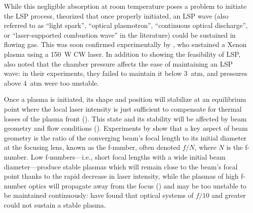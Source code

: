         While this negligible absorption at room temperature poses a problem to initiate the LSP process, \textcite{raizerSUBSONICPROPAGATIONLIGHT1970} theorized that once properly initiated, an LSP wave (also referred to as ``light spark'', ``optical plasmotron'', ``continuous optical discharge'', or ``laser-supported combustion wave'' in the literature) could be sustained in flowing gas. This was soon confirmed experimentally by \textcite{generalovContinuousOpticalDischarge1970}, who sustained a Xenon plasma using a 150~W CW  laser. In addition to showing the feasibility of LSP, \citeauthor{generalovContinuousOpticalDischarge1970} also noted that the chamber pressure affects the ease of maintaining an LSP wave: in their experiments, they failed to maintain it below 3~\unit{atm}, and pressures above 4~\unit{atm} were too unstable.

        Once a plasma is initiated, its shape and position will stabilize at an equilibrium point where the local laser intensity is just sufficient to compensate for thermal losses of the plasma front (\textcite{keeferLaserSustainedPlasmas1989}). This state and its stability will be affected by beam geometry and flow conditions (\textcite{welleEnergyConversionEfficiency1986}). Experiments by \textcite{fowlerIgnitionMaintenanceSubsonic1975} show that a key aspect of beam geometry is the ratio of the converging beam's focal length to its initial diameter at the focusing lens, known as the f-number, often denoted $f/N$, where $N$ is the f-number. Low f-numbers---i.e., short focal lengths with a wide initial beam diameter---produce stable plasmas which will remain close to the beam's focal point thanks to the rapid decrease in laser intensity, while the plasmas of high f-number optics will propagate away from the focus (\textcite{keeferLaserSustainedPlasmas1989}) and may be too unstable to be maintained continuously: \citeauthor{fowlerIgnitionMaintenanceSubsonic1975} have found that optical systems of $f/10$ and greater could not sustain a stable plasma.

